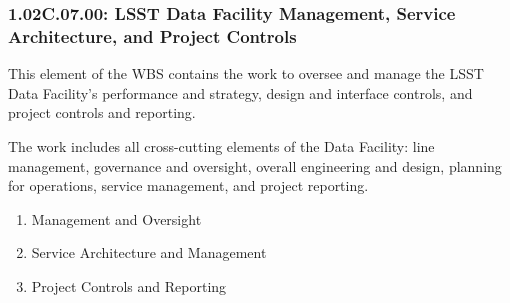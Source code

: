 \subsubsection{1.02C.07.00: LSST Data Facility Management, Service Architecture, and Project Controls}

This element of the WBS contains the work to oversee and manage the LSST Data Facility's performance and strategy, design and interface controls, and project controls and reporting.

The work includes all cross-cutting elements of the Data Facility: line management, governance and oversight, overall engineering and design, planning for operations, service management, and project reporting.

\begin{enumerate}

  \item{Management and Oversight}
  \item{Service Architecture and Management}
  \item{Project Controls and Reporting}

\end{enumerate}

